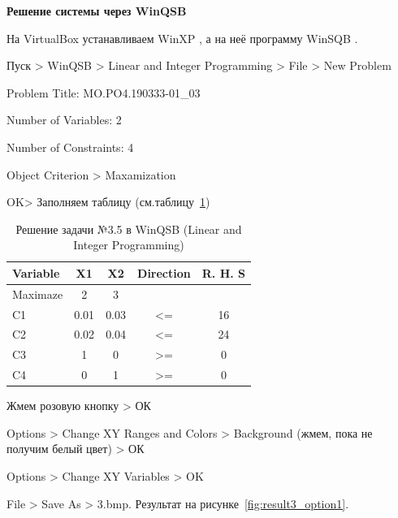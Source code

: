 \begin{center}
  \textbf{Решение системы через WinQSB}
\end{center}

На VirtualBox \cite{VirtualBox} устанавливаем WinXP \cite{WinXP}, а на неё программу WinSQB \cite{WinQSB}.

Пуск > WinQSB > Linear and Integer Programming > File > New Problem

Problem Title: MO.PO4.190333-01\_03

Number of Variables: 2

Number of Constraints: 4

Object Criterion > Maxamization

OK> Заполняем таблицу (см.таблицу~\ref{tab:3_5})

\begin{table}[h!]

  \centering

  \caption{Решение задачи №3.5 в WinQSB (Linear and Integer Programming)}
  \label{tab:3_5}

  \begin{tabular}{ |l||c|c|c|c| } 
    \hline
    Variable & X1 & X2 & Direction & R. H. S \\ \hline
    \hline
    Maximaze & 2 & 3 &  & \\ \hline
    C1 & 0.01 & 0.03 & <= & 16 \\ \hline
    C2 & 0.02 & 0.04 & <= & 24 \\ \hline
    C3 & 1 & 0 & >= & 0 \\ \hline
    C4 & 0 & 1 & >= & 0 \\ \hline
  \end{tabular}
\end{table}

Жмем розовую кнопку > ОК

Options > Change XY Ranges and Colors > Background (жмем, пока не получим белый цвет) > ОК

Options > Change XY Variables > OK

File > Save As > 3.bmp. Результат на рисунке~\ref{fig:result3_option1}.

